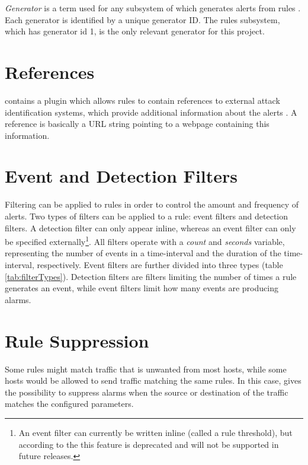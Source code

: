 \textit{Generator} is a term used for any subsystem of \snort{} which generates
alerts from rules \cite{SnortManual}. Each generator is identified by a unique
generator ID. The rules subsystem, which has generator id 1, is the only
relevant generator for this project.

\section{References}
\snort{} contains a plugin which allows rules to contain
references to external attack identification systems, which provide
additional information about the alerts \cite{SnortManual}. A reference is
basically a URL string pointing to a webpage containing this information.

\section{Event and Detection Filters}
Filtering can be applied to rules in order to control the amount and frequency
of alerts. Two types of filters can be applied to a rule: event filters and
detection filters. A detection filter can only appear inline, whereas an event
filter can only be specified externally\footnote{An event filter can currently
be written inline (called a rule threshold), but according to the \snortManual{}
this feature is deprecated and will not be supported in future releases.}. All
filters operate with a \textit{count} and \textit{seconds} variable,
representing the number of events in a time-interval and the duration of the
time-interval, respectively. Event filters are further divided into three types
(table \ref{tab:filterTypes}). Detection filters are filters limiting the number
of times a rule generates an event, while event filters limit how many events
are producing alarms.

\section{Rule Suppression}
Some rules might match traffic that is unwanted from most hosts, while some
hosts would be allowed to send traffic matching the same rules. In this case,
\snort{} gives the possibility to suppress alarms when the source
or destination of the traffic matches the configured parameters.

\renewcommand{\arraystretch}{1.5}

